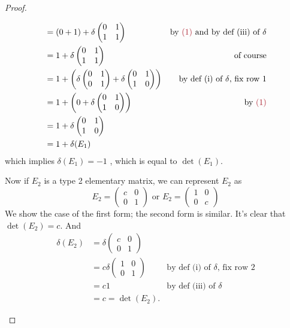 \begin{proof}
\begin{enumerate}
\begin{align*}
      & = (0 + 1) + \delta \begin{pmatrix} 0 & 1 \\ 1 & 1 \end{pmatrix} & \text{by \MAROON{(1)} and by def (iii) of \(\delta\)} \\
      & = 1 + \delta \begin{pmatrix} 0 & 1 \\ 1 & 1 \end{pmatrix} & \text{of course} \\
      & = 1 + \left( \delta \begin{pmatrix} 0 & 1 \\ 0 & 1 \end{pmatrix} + \delta \begin{pmatrix} 0 & 1 \\ 1 & 0 \end{pmatrix} \right) & \text{by def (i) of \(\delta\), fix row \(1\)} \\
      & = 1 + \left( 0 + \delta \begin{pmatrix} 0 & 1 \\ 1 & 0 \end{pmatrix} \right) & \text{by \MAROON{(1)}} \\
      & = 1 + \delta \begin{pmatrix} 0 & 1 \\ 1 & 0 \end{pmatrix} \\
      & = 1 + \delta(E_1)
\end{align*}
which implies \(\delta(E_1) = -1\) , which is equal to \(\det(E_1)\).

Now if \(E_2\) is a type 2 elementary matrix, we can represent \(E_2\) as
\[
    E_2 = \begin{pmatrix} c & 0 \\ 0 & 1
    \end{pmatrix}
    \text{ or }
    E_2 = \begin{pmatrix} 1 & 0 \\ 0 & c
    \end{pmatrix}
\]
We show the case of the first form; the second form is similar.
It's clear that \(\det(E_2) = c\).
And
\begin{align*}
    \delta(E_2) & = \delta \begin{pmatrix} c & 0 \\ 0 & 1 \end{pmatrix} \\
                & = c \delta \begin{pmatrix} 1 & 0 \\ 0 & 1 \end{pmatrix} & \text{by def (i) of \(\delta\), fix row \(2\)} \\
                & = c 1 & \text{by def (iii) of \(\delta\)} \\
                & = c = \det(E_2).
\end{align*}


\end{enumerate}
\end{proof}
